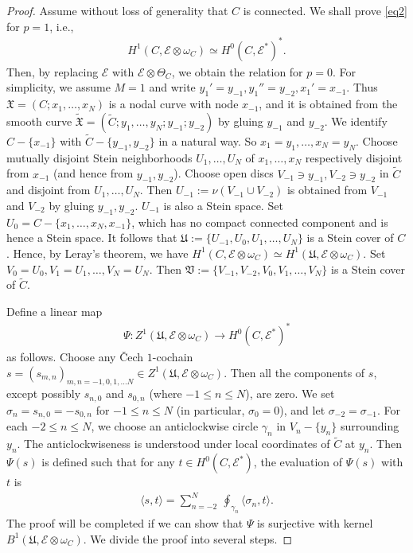 \documentclass[12pt,a4paper,notitlepage]{report}
\theoremstyle{definition}
\theoremstyle{plain}
\newcommand{\fk}{\mathfrak}
\newcommand{\wtd}{\widetilde}
\newcommand{\bk}[1]{\langle {#1}\rangle}
\newcommand{\scr}{\mathscr}
\numberwithin{equation}{section}
\begin{document}
\begin{proof}
Assume without loss of generality that $C$ is connected. We shall prove \eqref{eq2} for $p=1$, i.e., 
\begin{align*}
H^1(C,\scr E\otimes \omega_C)\simeq H^0(C,\scr E^*)^*.
\end{align*}
Then, by replacing $\scr E$ with $\scr E\otimes\Theta_C$, we obtain the relation for $p=0$. For simplicity, we assume $M=1$ and write $y_1'=y_{-1},y_1''=y_{-2},x_1'=x_{-1}$. Thus $\fk X=(C;x_1,\dots,x_N)$ is a nodal curve with node $x_{-1}$, and it is obtained from the smooth curve $\wtd{\fk X}=(\wtd C;y_1,\dots,y_N;y_{-1};y_{-2})$ by gluing $y_{-1}$ and $y_{-2}$. We identify $C-\{x_{-1}\}$ with $\wtd C-\{y_{-1},y_{-2}\}$ in a natural way. So $x_1=y_1,\dots,x_N=y_N$. Choose mutually disjoint Stein neighborhoods $U_1,\dots,U_N$ of $x_1,\dots,x_N$ respectively disjoint from $x_{-1}$ (and hence from $y_{-1},y_{-2}$). Choose open discs $V_{-1}\ni y_{-1},V_{-2}\ni y_{-2}$ in $\wtd C$ and disjoint from $U_1,\dots,U_N$. Then $U_{-1}:=\nu(V_{-1}\cup V_{-2})$ is obtained from $V_{-1}$ and $V_{-2}$ by gluing $y_{-1},y_{-2}$. $U_{-1}$ is also a Stein space. Set $U_0=C-\{x_1,\dots,x_N,x_{-1}\}$, which has no compact connected component and is hence a Stein space. It follows that $\fk U:=\{U_{-1},U_0,U_1,\dots,U_N\}$ is a Stein cover of $C$. Hence, by Leray's theorem, we have $H^1(C,\scr E\otimes \omega_C)\simeq H^1(\fk U,\scr E\otimes \omega_C)$. Set $V_0=U_0,V_1=U_1,\dots,V_N=U_N$. Then $\fk V:=\{V_{-1},V_{-2},V_0,V_1,\dots,V_N\}$ is a Stein cover of $\wtd C$. 

Define a linear map
\begin{align}
\Psi :Z^1(\fk U,\scr E\otimes\omega_C)\rightarrow H^0(C,\scr E^*)^*\label{eq219}
\end{align}
as follows. Choose any \v{C}ech $1$-cochain $s=(s_{m,n})_{m,n=-1,0,1,\dots N}\in Z^1(\fk U,\scr E\otimes\omega_C)$. Then all the components of $s$, except possibly $s_{n,0}$ and $s_{0,n}$ (where $-1\leq n\leq N$), are zero. We set $\sigma_n=s_{n,0}=-s_{0,n}$ for $-1\leq n\leq N$ (in particular, $\sigma_0=0$), and let $\sigma_{-2}=\sigma_{-1}$. For each $-2\leq n\leq N$, we choose an anticlockwise circle $\gamma_n$ in $V_n-\{y_n \}$ surrounding $y_n$. The anticlockwiseness is understood under local coordinates of $\wtd C$ at $y_n$. Then $\Psi(s)$ is defined such that for any $t\in H^0(C,\scr E^*)$, the evaluation of $\Psi(s)$ with $t$ is
\begin{align}
\bk{s,t}=\sum_{n=-2}^N~\oint_{\gamma_n}\bk{\sigma_n,t}.\label{eq157}
\end{align}
The proof will be completed if we can show that $\Psi$ is surjective with kernel $B^1(\fk U,\scr E\otimes\omega_C)$. We divide the proof into several steps.


\end{proof}
\end{document}
